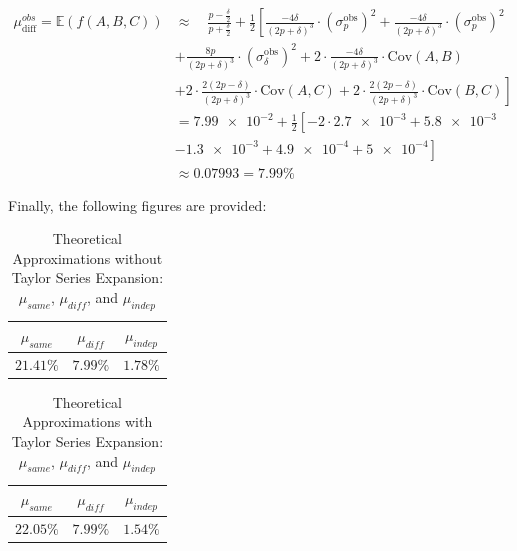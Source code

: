 \begin{equation}
    \begin{aligned}
    \mu_{\text{diff}}^{obs} = \mathbb{E}(f(A,B,C)) &\approx \quad \frac{p - \frac{\delta}{2}}{p + \frac{\delta}{2}} + \frac{1}{2} \left[ \frac{-4\delta}{(2p + \delta)^3}\cdot({\sigma^\text{obs}_p})^2 + \frac{-4\delta}{(2p + \delta)^3}\cdot({\sigma^\text{obs}_p})^2 \right. \\[2mm]
    & \left. + \frac{8p}{(2p + \delta)^3}\cdot({\sigma^\text{obs}_\delta})^2 + 2\cdot\frac{-4\delta}{(2p + \delta)^3}\cdot\text{Cov}(A,B) \right. \\[2mm] 
    & \left. + 2\cdot\frac{2(2p - \delta)}{(2p + \delta)^3}\cdot\text{Cov}(A,C) + 2\cdot\frac{2(2p - \delta)}{(2p + \delta)^3}\cdot\text{Cov}(B,C) \right]\\[10mm]
    & = \num{7.99e-2} + \frac{1}{2} \left[ -2\cdot\num{2.7e-3} + \num{5.8e-3}  \right. \\[2mm]
    & \left. - \num{1.3e-3} + \num{4.9e-4} + \num{5e-4} \right] \\[10mm]
    & \approx 0.07993 = 7.99\%
    \end{aligned}
    \label{eq:mu_diff}
\end{equation}

Finally, the following figures are provided:

\begin{table}[H]
    \centering
    \renewcommand{\arraystretch}{1.25}\begin{tabular}{|c|c|c|}
        \hline
        $\mu_{same}$ & $\mu_{diff}$ & $\mu_{indep}$\\
        \hline
        $21.41\%$ & $7.99\%$ & $1.78\%$\\
        \hline
    \end{tabular}
\caption{Theoretical Approximations without Taylor Series Expansion: $\mu_{same}$, $\mu_{diff}$, and $\mu_{indep}$}
\label{tab:mu_approx}
\end{table}


\begin{table}[H]
    \centering
    \renewcommand{\arraystretch}{1.25}\begin{tabular}{|c|c|c|}
        \hline
        $\mu_{same}$ & $\mu_{diff}$ & $\mu_{indep}$\\
        \hline
        $22.05\%$ & $7.99\%$ & $1.54\%$\\
        \hline
    \end{tabular}
\caption{Theoretical Approximations with Taylor Series Expansion: $\mu_{same}$, $\mu_{diff}$, and $\mu_{indep}$}
\label{tab:approximation_mu_taylor}
\end{table}

